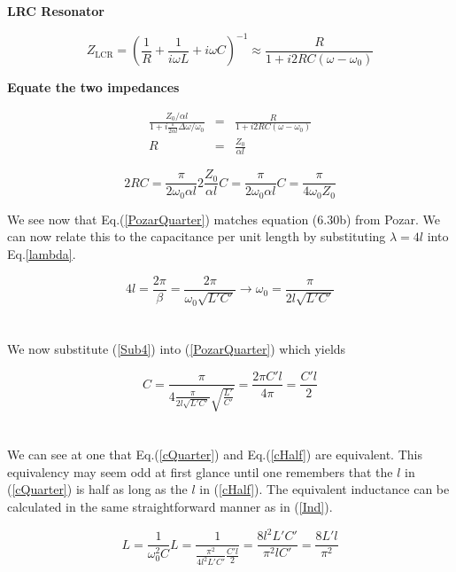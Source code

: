 \documentclass[12pt,reqno]{amsart}
\begin{document}
\textbf{LRC Resonator}

\begin{equation}
Z_{\text{LCR}} = \left(\frac{1}{R} + \frac{1}{i\omega L} + i\omega C\right)^{-1} \approx \frac{R}{1 + i2RC(\omega - \omega_0)}
\end{equation}

\textbf{Equate the two impedances}

\begin{eqnarray}
\frac{Z_0/\alpha l}{1 + i \frac{\pi}{2 \alpha l}\Delta \omega / \omega_0} &=& \frac{R}{1 + i2RC(\omega - \omega_0)} \\
R &=& \frac{Z_0}{\alpha l}
\end{eqnarray}

\begin{subequations}
	\begin{equation}
	2RC = \frac{\pi}{2\omega_0 \alpha l}
	\end{equation}
	\begin{equation}
	2\frac{Z_0}{\alpha l}C = \frac{\pi}{2\omega_0 \alpha l}
	\end{equation}
	\begin{equation}
	C = \frac{\pi}{4\omega_0 Z_0} \label{PozarQuarter}
	\end{equation}
\end{subequations}

We see now that Eq.(\ref{PozarQuarter}) matches equation (6.30b) from Pozar. We can now relate this to the capacitance per unit length by substituting $\lambda = 4l$ into Eq.\ref{lambda}.

\begin{equation}
4l = \frac{2\pi}{\beta} = \frac{2\pi}{\omega_0\sqrt{L'C'}} \rightarrow \omega_0 = \frac{\pi}{2l\sqrt{L'C'}} \label{Sub4}
\end{equation}
\\ \ \\
We now substitute (\ref{Sub4}) into (\ref{PozarQuarter}) which yields

\begin{equation}
C = \frac{\pi}{4 \frac{\pi}{2l \sqrt{L'C'}} \sqrt{\frac{L'}{C'}}} = \frac{2 \pi C' l}{4\pi} = \frac{C' l}{2} \label{cQuarter}
\end{equation}
\\ \ \\
We can see at one that Eq.(\ref{cQuarter}) and Eq.(\ref{cHalf}) are equivalent. This equivalency may seem odd at first glance until one remembers that the $l$ in (\ref{cQuarter}) is half as long as the $l$ in (\ref{cHalf}). The equivalent inductance can be calculated in the same straightforward manner as in (\ref{Ind}).

\begin{subequations}
	\begin{equation}
	L = \frac{1}{\omega_0^2 C}
	\end{equation}
	\begin{equation}
	L = \frac{1}{\frac{\pi^2}{4l^2 L'C'}\frac{C' l}{2}} = \frac{8 l^2 L' C'}{\pi^2 l C'} = \frac{8 L' l}{\pi^2}
	\end{equation}
\end{subequations}
\end{document}
